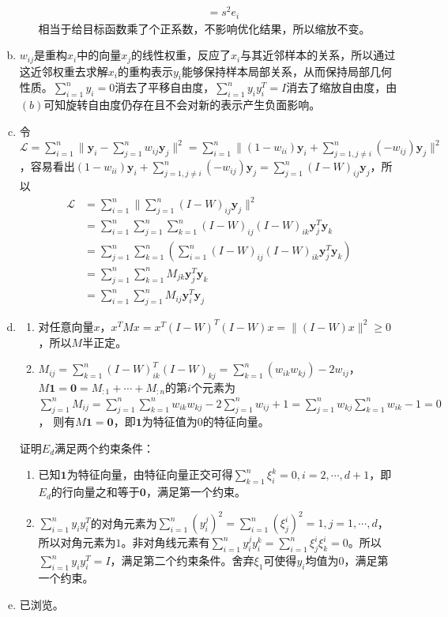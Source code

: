 \documentclass[a4paper,UTF8]{article}
\numberwithin{equation}{section}
\begin{document}
\begin{enumerate}[(a)]
\begin{enumerate}[i.]
\begin{align*}
                 &=s^2e_i
             \end{align*}
             相当于给目标函数乘了个正系数，不影响优化结果，所以缩放不变。
          \end{enumerate}
    \item $w_{ij}$是重构$x_i$中的向量$x_j$的线性权重，反应了$x_i$与其近邻样本的关系，所以通过这近邻权重去求解$x_i$的重构表示$y_i$能够保持样本局部关系，从而保持局部几何性质。$\sum_{i=1}^ny_i=0$消去了平移自由度，$\sum_{i=1}^ny_iy_i^T=I$消去了缩放自由度，由$(b)$可知旋转自由度仍存在且不会对新的表示产生负面影响。
    \item 令$\mathcal{L}=\sum_{i=1}^n\|\mathbf{y}_i-\sum_{j=1}^nw_{ij}\mathbf{y}_j\|^2=\sum_{i=1}^n\|(1-w_{ii})\mathbf{y}_i+\sum_{j=1,j\neq i}^n(-w_{ij})\mathbf{y}_j\|^2$，容易看出$(1-w_{ii})\mathbf{y}_i+\sum_{j=1,j\neq i}^n(-w_{ij})\mathbf{y}_j=\sum_{j=1}^{n}(I-W)_{ij}\mathbf{y}_j$，所以
    \begin{align*}
        \mathcal{L}&=\sum_{i=1}^n\|\sum_{j=1}^{n}(I-W)_{ij}\mathbf{y}_j\|^2\\
        &=\sum_{i=1}^n\sum_{j=1}^{n}\sum_{k=1}^n(I-W)_{ij}(I-W)_{ik}\mathbf{y}_j^T\mathbf{y}_k\\
        &=\sum_{j=1}^{n}\sum_{k=1}^n(\sum_{i=1}^n(I-W)_{ij}(I-W)_{ik}\mathbf{y}_j^T\mathbf{y}_k)\\
        &=\sum_{j=1}^{n}\sum_{k=1}^nM_{jk}\mathbf{y}_j^T\mathbf{y}_k\\
        &=\sum_{i=1}^{n}\sum_{j=1}^nM_{ij}\mathbf{y}_i^T\mathbf{y}_j
    \end{align*}
    \item \begin{enumerate}[1)]
        \item 对任意向量$x$，$x^TMx=x^T(I-W)^T(I-W)x=\|(I-W)x\|^2\geq0$，所以$M$半正定。
        \item $M_{ij}=\sum_{k=1}^{n}(I-W)_{ik}^T(I-W)_{kj}=\sum_{k=1}^n(w_{ik}w_{kj})-2w_{ij}$，$M\mathbf{1}=\mathbf{0}=M_{:1}+\cdots+M_{:n}$的第$i$个元素为$\sum_{j=1}^nM_{ij}=\sum_{j=1}^n\sum_{k=1}^nw_{ik}w_{kj}-2\sum_{j=1}^nw_{ij}+1=\sum_{j=1}^nw_{kj}\sum_{k=1}^nw_{ik}-1=0$，
        则有$M\mathbf{1}=\mathbf{0}$，即$\mathbf{1}$为特征值为$0$的特征向量。
    \end{enumerate}
    证明$E_d$满足两个约束条件：
    \begin{enumerate}[1)]
        \item 已知$\mathbf{1}$为特征向量，由特征向量正交可得$\sum_{k=1}^n\xi_i^{k}=0,i=2,\cdots,d+1$，即$E_d$的行向量之和等于$\mathbf{0}$，满足第一个约束。
        \item $\sum_{i=1}^ny_iy_i^T$的对角元素为$\sum_{i=1}^n(y_i^{j})^2=\sum_{i=1}^n(\xi_j^{i})^2=1,j=1,\cdots,d$，所以对角元素为$1$。非对角线元素有$\sum_{i=1}^ny_i^{j}y_i^k=\sum_{i=1}^n\xi_j^{i}\xi_k^i=0$。所以$\sum_{i=1}^ny_iy_i^T=I$，满足第二个约束条件。舍弃$\xi_1$可使得$y_i$均值为$0$，满足第一个约束。
    \end{enumerate}
    \item 已浏览。
\end{enumerate}
\end{document}
